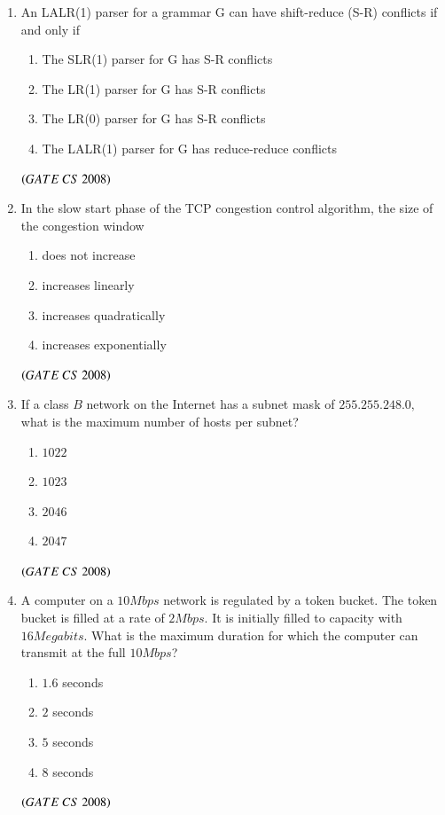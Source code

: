 \documentclass[journal, onecolumn]{IEEEtran}
\numberwithin{equation}{enumi}
\numberwithin{figure}{enumi}
\begin{document}
\begin{enumerate}
\item An LALR(1) parser for a grammar G can have shift-reduce (S-R) conflicts if and only if 
\begin{enumerate}
    \item  The SLR(1) parser for G has S-R conflicts
    \item The LR(1) parser for G has S-R conflicts
    \item The LR(0) parser for G has S-R conflicts
    \item The LALR(1) parser for G has reduce-reduce conflicts
\end{enumerate}
\hfill $\left(GATE\ CS\  2008\right)$
\bigskip

\item In the slow start phase of the TCP congestion control algorithm, the size of the congestion window
\vspace{-1em}%
\begin{multicols}{2}
\begin{enumerate}
  \item  does not increase
  \item  increases linearly
  \item increases quadratically
  \item increases exponentially
\end{enumerate}
\end{multicols}
\hfill $\left(GATE\ CS\  2008\right)$

\item If a class $B$ network on the Internet has a subnet mask of $255.255.248.0,$ what is the maximum number of hosts per subnet? 
\vspace{-1em}%
\begin{multicols}{4}
\begin{enumerate}
   \item $1022$
   \item $1023$
   \item $2046$
   \item $2047$
\end{enumerate}
\end{multicols}
\hfill $\left(GATE\ CS\  2008\right)$

\item A computer on a $10Mbps$ network is regulated by a token bucket. The token bucket is filled at a rate of $2Mbps$. It is initially filled to capacity with $16Megabits$. What is the maximum duration for which the computer can transmit at the full $10Mbps$? 
\vspace{-1em}%
\begin{multicols}{4}
\begin{enumerate}
  \item  $1.6$ seconds
  \item  $2$ seconds
  \item  $5$ seconds
  \item  $8$ seconds
\end{enumerate}
\end{multicols}
\hfill $\left(GATE\ CS\  2008\right)$


\end{enumerate}
\end{document}
